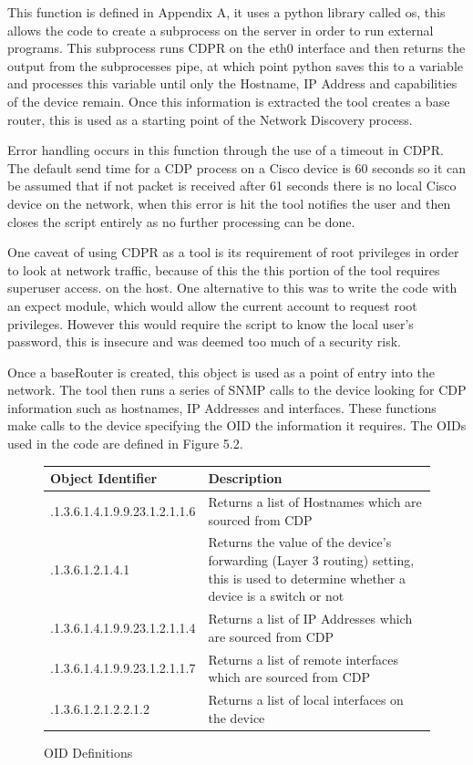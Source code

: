 \documentclass[11pt]{report}
\begin{document}
This function is defined in Appendix A, it uses a python library called os, this allows the code to create a subprocess on the server in order to run external programs. This subprocess runs CDPR on the eth0 interface and then returns the output from the subprocesses pipe, at which point python saves this to a variable and processes this variable until only the Hostname, IP Address and capabilities of the device remain. Once this information is extracted the tool creates a base router, this is used as a starting point of the Network Discovery process.

Error handling occurs in this function through the use of a timeout in CDPR. The default send time for a CDP process on a Cisco device is 60 seconds so it can be assumed that if not packet is received after 61 seconds there is no local Cisco device on the network, when this error is hit the tool notifies the user and then closes the script entirely as no further processing can be done.

One caveat of using CDPR as a tool is its requirement of root privileges in order to look at network traffic, because of this the this portion of the tool requires superuser access. on the host. One alternative to this was to write the code with an expect module, which would allow the current account to request root privileges. However this would require the script to know the local user's password, this is insecure and was deemed too much of a security risk.

Once a baseRouter is created, this object is used as a point of entry into the network. The tool then runs a series of SNMP calls to the device looking for CDP information such as hostnames, IP Addresses and interfaces. These functions make calls to the device specifying the OID the information it requires. The OIDs used in the code are defined in Figure 5.2.

\begin{figure}[h!]
	\caption{OID Definitions}
	\centering
	\begin{tabular}{|l|p{11cm}|}
		\hline \textbf{Object Identifier} & \textbf{Description} \\ 
		\hline .1.3.6.1.4.1.9.9.23.1.2.1.1.6 & Returns a list of Hostnames which are sourced from CDP \\ 
		\hline .1.3.6.1.2.1.4.1 & Returns the value of the device's forwarding (Layer 3 routing) setting, this is used to determine whether a device is a switch or not \\ 
		\hline .1.3.6.1.4.1.9.9.23.1.2.1.1.4 & Returns a list of IP Addresses which are sourced from CDP \\ 
		\hline .1.3.6.1.4.1.9.9.23.1.2.1.1.7 & Returns a list of remote interfaces which are sourced from CDP \\
		\hline .1.3.6.1.2.1.2.2.1.2 & Returns a list of local interfaces on the device \\
		\hline 
	\end{tabular} 
\end{figure}
\end{document}
